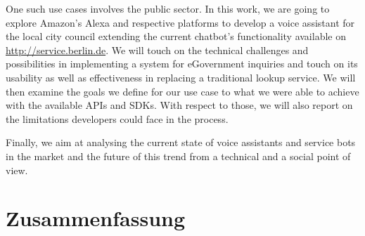 One such use cases involves the public sector. In this work, we are going to explore Amazon's Alexa and respective platforms to develop a voice assistant for the local city council extending the current chatbot's functionality available on \href{ https://service.berlin.de/virtueller-assistent/virtueller-assistent-606279.php}{http://service.berlin.de}. We will touch on the technical challenges and possibilities in implementing a system for eGovernment inquiries and touch on its usability as well as effectiveness in replacing a traditional lookup service. We will then examine the goals we define for our use case to what we were able to achieve with the available APIs and SDKs. With respect to those, we will also report on the limitations developers could face in the process.

Finally, we aim at analysing the current state of voice assistants and service bots in the market and the future of this trend from a technical and a social point of view.



\newpage
\chapter*{Zusammenfassung}


